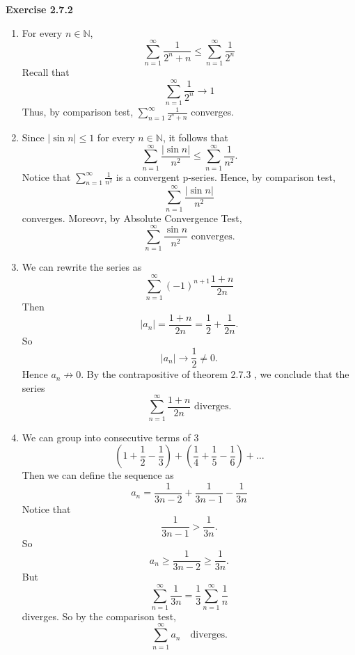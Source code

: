 \documentclass[12pt]{article}
\begin{document}
\textbf{Exercise 2.7.2}
\begin{enumerate}[label=(\alph*)]
    \item For every \( n \in \mathbb{N} \),
          \[
              \sum_{n=1}^{\infty} \frac{1}{2^n + n} \leq \sum_{n=1}^{\infty} \frac{1}{2^n}
          \]
          Recall that
          \[
              \sum_{n=1}^{\infty} \frac{1}{2^n} \to 1
          \]
          Thus, by comparison test, \(  \sum_{n=1}^{\infty} \frac{1}{2^n + n} \) converges.


    \item Since \( \vert \sin n \vert  \leq 1 \)  for every \( n \in \mathbb{N} \), it follows that
          \[
              \sum_{n=1}^{\infty} \frac{\vert \sin n \vert }{n^2} \leq \sum_{n=1}^{\infty} \frac{1}{n^2}.
          \]
          Notice that \( \sum_{n=1}^{\infty} \frac{1}{n^2} \) is a convergent p-series.
          Hence, by comparison test,
          \[
              \sum_{n=1}^{\infty} \frac{ | \sin n | }{n^2}
          \]
          converges. Moreovr, by Absolute Convergence Test,
          \[
              \sum_{n=1}^{\infty} \frac{ \sin n }{n^2} \text{  converges}.
          \]

    \item We can rewrite the series as
          \[
              \sum_{n=1}^{\infty}  (-1)^{n+1} \frac{1 + n}{2n}
          \]
          Then
          \[
              \vert a_n \vert  = \frac{1+n}{2n} = \frac{1}{2} + \frac{1}{2n}.
          \]
          So
          \[
              \vert a_n \vert \to \frac{1}{2} \neq 0.
          \]
          Hence \( a_n \not \to 0 \).
          By the contrapositive of theorem 2.7.3 , we conclude that the series
          \[
              \sum_{n=1}^{\infty}  \frac{1 + n}{2n} \text{ diverges.}
          \]


    \item We can group into consecutive terms of 3
          \[
              (1 + \frac{1}{2} - \frac{1}{3} ) + (\frac{1}{4} + \frac{1}{5} - \frac{1}{6}) + \dots
          \]
          Then we can define the sequence as
          \[
              a_n = \frac{1}{3n - 2} + \frac{1}{3n - 1} - \frac{1}{3n}
          \]
          Notice that
          \[
              \frac{1}{3n - 1} > \frac{1}{3n}.
          \]
          So
          \[
              a_n \geq  \frac{1}{3n-2} \geq \frac{1}{3n}.
          \]
          But
          \[
              \sum_{n=1}^{\infty} \frac{1}{3n} = \frac{1}{3} \sum_{n=1}^{\infty}  \frac{1}{n}
          \]
          diverges.
          So by the comparison test,
          \[
              \sum_{n=1}^{\infty} a_n \quad \text{diverges.}
          \]



\end{enumerate}
\end{document}
